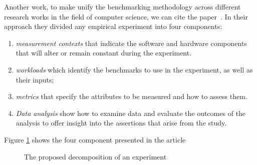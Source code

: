 Another work, to make unify the benchmarking methodology across different research works in the field of computer science, we can cite the paper~\cite{stephen_evaluate_2012}. In their approach they  divided any empirical experiment into four  components:

\begin{enumerate}
    \item \emph{measurement contexts} that indicate the software and hardware components that will alter or remain constant during the experiment.
    \item \emph{workloads} which identify the benchmarks to use in the experiment, as well as their inputs;
    \item \emph{metrics} that specify the attributes to be measured and how to assess them.
    \item \emph{Data analysis} show how to examine data and evaluate the outcomes of the analysis to offer insight into the assertions that arise from the study.
\end{enumerate}

Figure \ref{fig:soa_expermiment_component} shows the four component presented in the article~~\cite{stephen_evaluate_2012}


\begin{figure}[!hbt]
    \caption{The proposed decomposition of an experiment~\cite{stephen_evaluate_2012}}\label{fig:soa_expermiment_component}
\end{figure}



